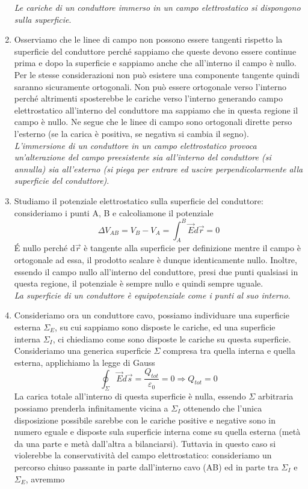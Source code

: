 \documentclass[10pt,a4paper]{article}
\begin{document}
\begin{enumerate}
\textit{Le cariche di un conduttore immerso in un campo elettrostatico si dispongono sulla superficie}.
\item Osserviamo che le linee di campo non possono essere tangenti rispetto la superficie del conduttore perché sappiamo che queste devono essere continue prima e dopo la superficie e sappiamo anche che all'interno il campo è nullo. Per le stesse considerazioni non può esistere una componente tangente quindi saranno sicuramente ortogonali. Non può essere ortogonale verso l'interno perché altrimenti sposterebbe le cariche verso l'interno generando campo elettrostatico all'interno del conduttore ma sappiamo che in questa regione il campo è nullo. Ne segue che le linee di campo sono ortogonali dirette perso l'esterno (se la carica è positiva, se negativa si cambia il segno).\\
\textit{L'immersione di un conduttore in un campo elettrostatico provoca un'alterazione del campo preesistente sia all'interno del conduttore (si annulla) sia all'esterno (si piega per entrare ed uscire perpendicolarmente alla superficie del conduttore)}.
\item Studiamo il potenziale elettrostatico sulla superficie del conduttore: consideriamo i punti A, B e calcoliamone il potenziale
\[\Delta V_{AB} = V_B - V_A = \int_A^B \vec{E}d\vec{r} = 0\]
\'E nullo perché d$\vec{r}$ è tangente alla superficie per definizione mentre il campo è ortogonale ad essa, il prodotto scalare è dunque identicamente nullo. Inoltre, essendo il campo nullo all'interno del conduttore, presi due punti qualsiasi in questa regione, il potenziale è sempre nullo e quindi sempre uguale.\\
\textit{La superficie di un conduttore è equipotenziale come i punti al suo interno}.
\item Consideriamo ora un conduttore cavo, possiamo individuare una superficie esterna $\Sigma_E$, su cui sappiamo sono disposte le cariche, ed una superficie interna $\Sigma_I$, ci chiediamo come sono disposte le cariche su questa superficie. Consideriamo una generica superficie $\Sigma$ compresa tra quella interna e quella esterna, applichiamo la legge di Gauss
\[\oint_\Sigma \vec{E}d\vec{s} = \frac{Q_{tot}}{\varepsilon_0} = 0 \Rightarrow Q_{tot} = 0\]
La carica totale all'interno di questa superficie è nulla, essendo $\Sigma$ arbitraria possiamo prenderla infinitamente vicina a $\Sigma_I$ ottenendo che l'unica disposizione possibile sarebbe con le cariche positive e negative sono in numero eguale e disposte sula superficie interna come su quella esterna (metà da una parte e metà dall'altra a bilanciarsi). Tuttavia in questo caso si violerebbe la conservatività del campo elettrostatico: consideriamo un percorso chiuso passante in parte dall'interno cavo (AB) ed in parte tra $\Sigma_I$ e $\Sigma_E$, avremmo

\end{enumerate}
\end{document}
